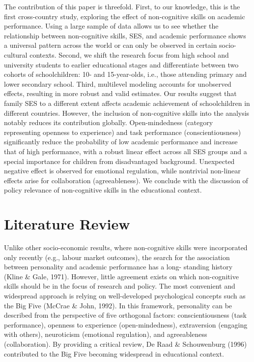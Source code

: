 \documentclass[
  12pt,
  a4paper,
]{article}
\begin{document}
The contribution of this paper is threefold. First, to our knowledge,
this is the first cross-country study, exploring the effect of
non-cognitive skills on academic performance. Using a large sample of
data allows us to see whether the relationship between non-cognitive
skills, SES, and academic performance shows a universal pattern across
the world or can only be observed in certain socio-cultural contexts.
Second, we shift the research focus from high school and university
students to earlier educational stages and differentiate between two
cohorts of schoolchildren: 10- and 15-year-olds, i.e., those attending
primary and lower secondary school. Third, multilevel modeling accounts
for unobserved effects, resulting in more robust and valid estimates.
Our results suggest that family SES to a different extent affects
academic achievement of schoolchildren in different countries. However,
the inclusion of non-cognitive skills into the analysis notably reduces
its contribution globally. Open-mindedness (category representing
openness to experience) and task performance (conscientiousness)
significantly reduce the probability of low academic performance and
increase that of high performance, with a robust linear effect across
all SES groups and a special importance for children from disadvantaged
background. Unexpected negative effect is observed for emotional
regulation, while nontrivial non-linear effects arise for collaboration
(agreeableness). We conclude with the discussion of policy relevance of
non-cognitive skills in the educational context.

\hypertarget{literature-review}{%
\section{Literature Review}\label{literature-review}}

Unlike other socio-economic results, where non-cognitive skills were
incorporated only recently (e.g., labour market outcomes), the search
for the association between personality and academic performance has a
long- standing history (Kline \& Gale, 1971). However, little agreement
exists on which non-cognitive skills should be in the focus of research
and policy. The most convenient and widespread approach is relying on
well-developed psychological concepts such as the Big Five (McCrae \&
John, 1992). In this framework, personality can be described from the
perspective of five orthogonal factors: conscientiousness (task
performance), openness to experience (open-mindedness), extraversion
(engaging with others), neuroticism (emotional regulation), and
agreeableness (collaboration). By providing a critical review, De Raad
\& Schouwenburg (1996) contributed to the Big Five becoming widespread
in educational context.
\end{document}
